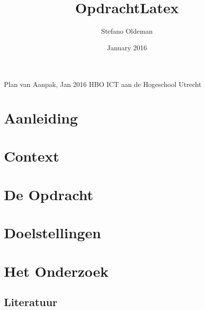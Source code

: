 \documentclass{report} %
\title{OpdrachtLatex}
\author{Stefano Oldeman}
\date{January 2016}
\begin{document}
\begin{titlepage} %

\begin{center}
    
    Plan van Aanpak, Jan 2016
    HBO ICT aan de Hogeschool Utrecht
\end{center}
\end{titlepage}

\maketitle

\tableofcontents{}



\chapter{Aanleiding} %

\chapter{Context} %


\chapter{De Opdracht} %


\chapter{Doelstellingen} %



\chapter{Het Onderzoek} %

\section{Literatuur} %
\end{document}

